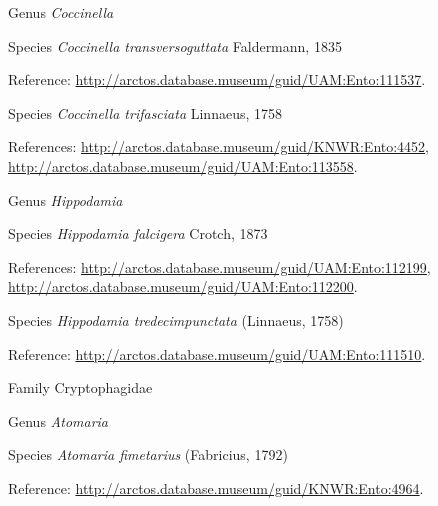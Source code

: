 \documentclass[9pt, article]{memoir}
\begin{document}
\begin{multicols}{2}
\vspace{6pt}\noindent\hspace{30pt}Genus \textit{Coccinella}


\vspace{6pt}\noindent\hspace{36pt}Species \textit{Coccinella transversoguttata} Faldermann, 1835


\vspace{6pt}Reference: 
\url{http://arctos.database.museum/guid/UAM:Ento:111537}.

\vspace{6pt}\noindent\hspace{36pt}Species \textit{Coccinella trifasciata} Linnaeus, 1758


\vspace{6pt}References: 
\url{http://arctos.database.museum/guid/KNWR:Ento:4452}, 
\url{http://arctos.database.museum/guid/UAM:Ento:113558}.

\vspace{6pt}\noindent\hspace{30pt}Genus \textit{Hippodamia}


\vspace{6pt}\noindent\hspace{36pt}Species \textit{Hippodamia falcigera} Crotch, 1873


\vspace{6pt}References: 
\url{http://arctos.database.museum/guid/UAM:Ento:112199}, 
\url{http://arctos.database.museum/guid/UAM:Ento:112200}.

\vspace{6pt}\noindent\hspace{36pt}Species \textit{Hippodamia tredecimpunctata} (Linnaeus, 1758)


\vspace{6pt}Reference: 
\url{http://arctos.database.museum/guid/UAM:Ento:111510}.

\vspace{6pt}\noindent\hspace{24pt}Family Cryptophagidae


\vspace{6pt}\noindent\hspace{30pt}Genus \textit{Atomaria}


\vspace{6pt}\noindent\hspace{36pt}Species \textit{Atomaria fimetarius} (Fabricius, 1792)


\vspace{6pt}Reference: 
\url{http://arctos.database.museum/guid/KNWR:Ento:4964}.


\end{multicols}
\end{document}
